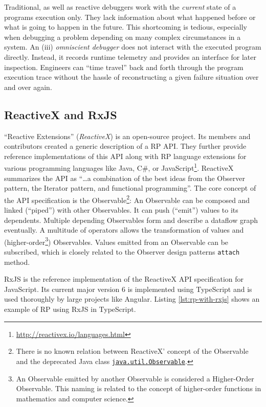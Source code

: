 \documentclass[12pt,a4paper]{article}
\begin{document}
Traditional, as well as reactive debuggers work with the \emph{current} state of a programs execution only. They lack information about what happened before or what is going to happen in the future. This shortcoming is tedious, especially when debugging a problem depending on many complex circumstances in a system. An (iii) \emph{omniscient debugger} \cite{5287015} \cite{DBLP:journals/corr/OCallahanJFHNP17} does not interact with the executed program directly. Instead, it records runtime telemetry and provides an interface for later inspection. Engineers can ``time travel'' back and forth through the program execution trace without the hassle of reconstructing a given failure situation over and over again.

\subsection{ReactiveX and RxJS}

``Reactive Extensions'' (\emph{ReactiveX}) is an open-source project. Its members and contributors created a generic description of a RP API. They further provide reference implementations of this API along with RP language extensions for various programming languages like Java, C\#, or JavaScript\footnote{\url{http://reactivex.io/languages.html}}. ReactiveX summarizes the API as ``\dots a combination of the best ideas from the Observer pattern, the Iterator pattern, and functional programming''\cite{reactivex}. The core concept of the API specification is the Observable\footnote{There is no known relation between ReactiveX' concept of the Observable and the deprecated Java class \href{https://docs.oracle.com/en/java/javase/11/docs/api/java.base/java/util/Observable.html}{\texttt{java.util.Observable}}.}: An Observable can be composed and linked (``piped'') with other Observables. It can push (``emit'') values to its dependents. Multiple depending Observables form and describe a dataflow graph eventually. A multitude of operators allows the transformation of values and (higher-order\footnote{An Observable emitted by another Observable is considered a Higher-Order Observable. This naming is related to the concept of higher-order functions in mathematics and computer science.}) Observables. Values emitted from an Observable can be subscribed, which is closely related to the Observer design patterns \texttt{attach} method.

RxJS is the reference implementation of the ReactiveX API specification for JavaScript. Its current major version 6 is implemented using TypeScript and is used thoroughly by large projects like Angular\cite{angualrrxjs}. Listing \ref{lst:rp-with-rxjs} shows an example of RP using RxJS in TypeScript.
\end{document}
